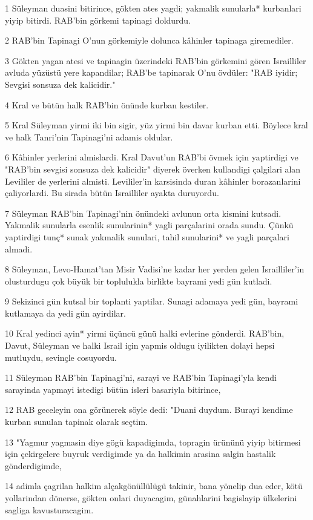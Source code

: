\par 1 Süleyman duasini bitirince, gökten ates yagdi; yakmalik sunularla* kurbanlari yiyip bitirdi. RAB'bin görkemi tapinagi doldurdu.
\par 2 RAB'bin Tapinagi O'nun görkemiyle dolunca kâhinler tapinaga giremediler.
\par 3 Gökten yagan atesi ve tapinagin üzerindeki RAB'bin görkemini gören Israilliler avluda yüzüstü yere kapandilar; RAB'be tapinarak O'nu övdüler: "RAB iyidir; Sevgisi sonsuza dek kalicidir."
\par 4 Kral ve bütün halk RAB'bin önünde kurban kestiler.
\par 5 Kral Süleyman yirmi iki bin sigir, yüz yirmi bin davar kurban etti. Böylece kral ve halk Tanri'nin Tapinagi'ni adamis oldular.
\par 6 Kâhinler yerlerini almislardi. Kral Davut'un RAB'bi övmek için yaptirdigi ve "RAB'bin sevgisi sonsuza dek kalicidir" diyerek överken kullandigi çalgilari alan Levililer de yerlerini almisti. Levililer'in karsisinda duran kâhinler borazanlarini çaliyorlardi. Bu sirada bütün Israilliler ayakta duruyordu.
\par 7 Süleyman RAB'bin Tapinagi'nin önündeki avlunun orta kismini kutsadi. Yakmalik sunularla esenlik sunularinin* yagli parçalarini orada sundu. Çünkü yaptirdigi tunç* sunak yakmalik sunulari, tahil sunularini* ve yagli parçalari almadi.
\par 8 Süleyman, Levo-Hamat'tan Misir Vadisi'ne kadar her yerden gelen Israilliler'in olusturdugu çok büyük bir toplulukla birlikte bayrami yedi gün kutladi.
\par 9 Sekizinci gün kutsal bir toplanti yaptilar. Sunagi adamaya yedi gün, bayrami kutlamaya da yedi gün ayirdilar.
\par 10 Kral yedinci ayin* yirmi üçüncü günü halki evlerine gönderdi. RAB'bin, Davut, Süleyman ve halki Israil için yapmis oldugu iyilikten dolayi hepsi mutluydu, sevinçle cosuyordu.
\par 11 Süleyman RAB'bin Tapinagi'ni, sarayi ve RAB'bin Tapinagi'yla kendi sarayinda yapmayi istedigi bütün isleri basariyla bitirince,
\par 12 RAB geceleyin ona görünerek söyle dedi: "Duani duydum. Burayi kendime kurban sunulan tapinak olarak seçtim.
\par 13 "Yagmur yagmasin diye gögü kapadigimda, topragin ürününü yiyip bitirmesi için çekirgelere buyruk verdigimde ya da halkimin arasina salgin hastalik gönderdigimde,
\par 14 adimla çagrilan halkim alçakgönüllülügü takinir, bana yönelip dua eder, kötü yollarindan dönerse, gökten onlari duyacagim, günahlarini bagislayip ülkelerini sagliga kavusturacagim.
